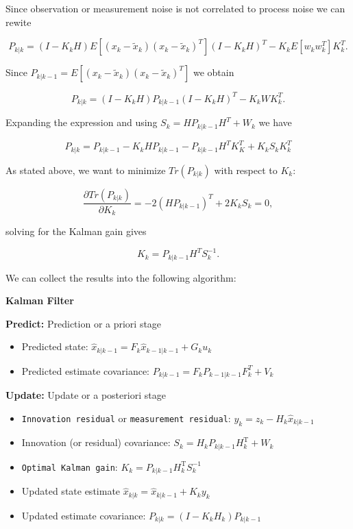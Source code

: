 Since observation or measurement noise is not correlated to process
noise we can rewite

\[P_{k|k} = (I - K_kH) E[(x_k-\tilde{x}_k)(x_k-\tilde{x}_k)^T](I - K_kH)^T -  K_kE[w_kw_k^T] K_k^T.\]

Since \(P_{k|k-1} = E[(x_k-\tilde{x}_k)(x_k-\tilde{x}_k)^T]\) we obtain

\[P_{k|k} = (I - K_kH) P_{k|k-1} (I - K_kH)^T -  K_k W K_k^T .\]

Expanding the expression and using \(S_k = H P_{k|k-1} H^T + W_k\) we
have

\[P_{k|k}  = P_{k|k-1}  - K_kH P_{k|k-1} - P_{k|k-1} H^T K_K^T + K_k S_k K_k^T\]

As stated above, we want to minimize \(Tr(P_{k|k})\) with respect to
\(K_k\):

\[\frac{\partial Tr(P_{k|k})}{\partial K_k} = -2(H P_{k|k-1})^T + 2K_k S_k = 0,\]

solving for the Kalman gain gives

\[K_k = P_{k|k-1}H^T S^{-1}_k .\]

We can collect the results into the following algorithm:

\textbf{Kalman Filter}

\textbf{Predict:} Prediction or a priori stage

\begin{itemize}
\tightlist
\item
  Predicted state:
  \(\hat{x}_{k|k-1} = F_{k}\hat{x}_{k-1|k-1} + G_{k} u_{k}\)
\item
  Predicted estimate covariance:
  \(P_{k|k-1} = F_{k} P_{k-1|k-1} F_{k}^{T} + V_{k}\)
\end{itemize}

\textbf{Update:} Update or a posteriori stage

\begin{itemize}
\tightlist
\item
  \texttt{Innovation\ residual} or \texttt{measurement\ residual}:
  \(y_k = z_k - H_k\hat{x}_{k|k-1}\)
\item
  Innovation (or residual) covariance:
  \(S_k = H_k P_{k|k-1} H_k^\text{T} + W_k\)
\item
  \texttt{Optimal\ Kalman\ gain}:
  \(K_k = P_{k|k-1}H_k^\text{T}S_k^{-1}\)
\item
  Updated state estimate \(\hat{x}_{k|k} =\hat{x}_{k|k-1} + K_k y_k\)
\item
  Updated estimate covariance: \(P_{k|k} = (I - K_k H_k) P_{k|k-1}\)
\end{itemize}

